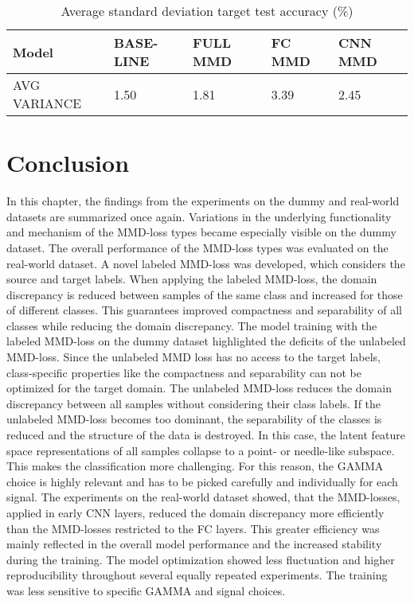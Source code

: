 \begin {table}[H]
\centering
\begin{tabular}{lllll}
  \toprule
  Model & BASE-LINE & FULL MMD & FC MMD & CNN MMD\\
  \midrule
  AVG VARIANCE & 1.50 & 1.81 & 3.39 & 2.45\\
  \bottomrule
\end{tabular}
\caption {Average standard deviation target test accuracy (\%)} \label{tab:Average_Variance_Accuracy} 
\end {table}

\section{Conclusion}\label{ch:Performance_overview}
In this chapter, the findings from the experiments on the dummy and real-world datasets are summarized once again. Variations in the underlying functionality and mechanism of the MMD-loss types became especially visible on the dummy dataset. The overall performance of the MMD-loss types was evaluated on the real-world dataset. A novel labeled MMD-loss was developed, which considers the source and target labels. When applying the labeled MMD-loss, the domain discrepancy is reduced between samples of the same class and increased for those of different classes. This guarantees improved compactness and separability of all classes while reducing the domain discrepancy. The model training with the labeled MMD-loss on the dummy dataset highlighted the deficits of the unlabeled MMD-loss. Since the unlabeled MMD loss has no access to the target labels, class-specific properties like the compactness and separability can not be optimized for the target domain. The unlabeled MMD-loss reduces the domain discrepancy between all samples without considering their class labels. If the unlabeled MMD-loss becomes too dominant, the separability of the classes is reduced and the structure of the data is destroyed. In this case, the latent feature space representations of all samples collapse to a point- or needle-like subspace. This makes the classification more challenging. For this reason, the GAMMA choice is highly relevant and has to be picked carefully and individually for each signal. The experiments on the real-world dataset showed, that the MMD-losses, applied in early CNN layers, reduced the domain discrepancy more efficiently than the MMD-losses restricted to the FC layers. This greater efficiency was mainly reflected in the overall model performance and the increased stability during the training.
The model optimization showed less fluctuation and higher reproducibility throughout several equally repeated experiments. The training was less sensitive to specific GAMMA and signal choices. 